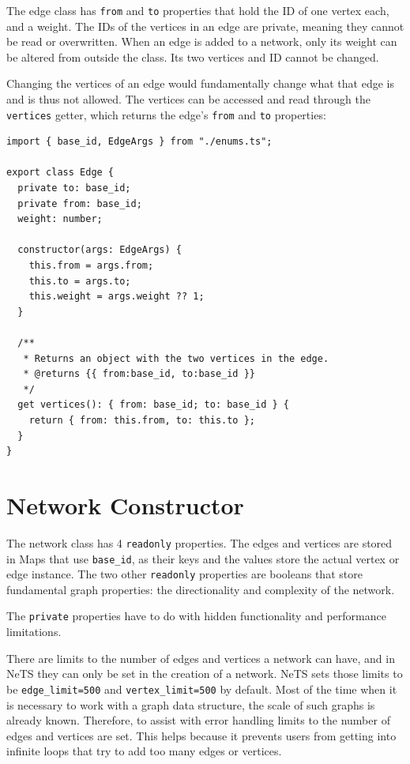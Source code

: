 The edge class has \texttt{from} and \texttt{to} properties that hold
the ID of one vertex each, and a weight.
The IDs of the vertices in an edge are private,
meaning they cannot be read or overwritten.
When an edge is added to a network, only its weight can be altered from outside the class.
Its two vertices and ID cannot be changed. 

Changing the vertices of an edge would fundamentally change what that edge is and is thus not allowed.
The vertices can be accessed and read through the \texttt{vertices} getter,
which returns the edge's \texttt{from} and \texttt{to} properties:

\begin{verbatim}
import { base_id, EdgeArgs } from "./enums.ts";

export class Edge {
  private to: base_id;
  private from: base_id;
  weight: number;

  constructor(args: EdgeArgs) {
    this.from = args.from;
    this.to = args.to;
    this.weight = args.weight ?? 1;
  }

  /**
   * Returns an object with the two vertices in the edge.
   * @returns {{ from:base_id, to:base_id }}
   */
  get vertices(): { from: base_id; to: base_id } {
    return { from: this.from, to: this.to };
  }
}
\end{verbatim}

\section{Network Constructor}

The network class has 4 \texttt{readonly} properties.
The edges and vertices are stored in Maps that use \texttt{base_id},
as their keys and the values store the actual vertex or edge instance.
The two other \texttt{readonly} properties are booleans that store fundamental graph properties:
the directionality and complexity of the network.

The \texttt{private} properties have to do with hidden functionality
and performance limitations.

There are limits to the number of edges and vertices a network can have,
and in NeTS they can only be set in the creation of a network.
NeTS sets those limits to be \texttt{edge_limit=500} and \texttt{vertex_limit=500}
by default.
Most of the time when it is necessary to work with a graph data structure,
the scale of such graphs is already known.
Therefore, to assist with error handling limits to the number of edges and vertices are set.
This helps because it prevents users from getting into infinite loops that try to add
too many edges or vertices.

